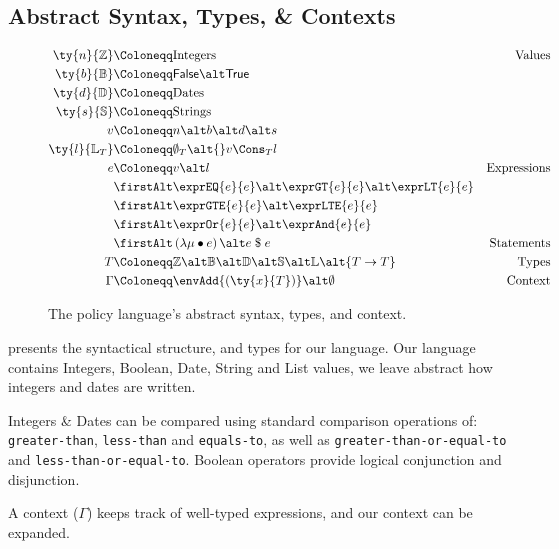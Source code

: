 \subsection{Abstract Syntax, Types, \& Contexts}
\label{subsec:defs}

\begin{figure}[ht]
  \centering
\begin{align*}
  \ty{n}{\mathbb{Z}}
  &
    \Coloneqq
    \text{Integers}
  & \text{Values}
  \\
  \ty{b}{\mathbb{B}}
  & \Coloneqq
    \mathsf{False}\alt\mathsf{True}
  \\
  \ty{d}{\mathbb{D}}
  & \Coloneqq
    \text{Dates}
  \\
  \ty{s}{\mathbb{S}}
  & \Coloneqq
    \text{Strings}
  \\
  v
  &
    \Coloneqq
    n
    \alt
    b
    \alt
    d
    \alt
    s
  \\
  \ty{l}{\mathbb{L}_T}
  & \Coloneqq
    \emptyset_T\alt{}v\Cons_T{}l
  \\
  e
  &
    \Coloneqq
    v
    \alt
    l
  & \text{Expressions}
  \\
  &
    \firstAlt
    \exprEQ{e}{e}
    \alt
    \exprGT{e}{e}
    \alt
    \exprLT{e}{e}
  \\
  & \firstAlt
    \exprGTE{e}{e}
    \alt
    \exprLTE{e}{e}
  &
  \\
  & \firstAlt
    \exprOr{e}{e}
    \alt
    \exprAnd{e}{e}
  &
  \\
  &
    \firstAlt
    \left( \lambda \mu \bullet e \right)
    \alt
    e \; \$ \; e
  &
    \text{Statements}
  \\
  T
  &
    \Coloneqq
    \mathbb{Z}
    \alt
    \mathbb{B}
    \alt
    \mathbb{D}
    \alt
    \mathbb{S}
    \alt
    \mathbb{L}
    \alt
    {T \rightarrow{} T}
  &
    \text{Types}
  \\
  \Gamma
  &
    \Coloneqq
    \envAdd{(\ty{x}{T})}
    \alt
    \emptyset
    &
      \text{Context}
\end{align*}
  \caption{\label{fig:syntax}The policy language's abstract syntax, types, and context.}
\end{figure}

 presents the syntactical structure, and types for our language.
Our language contains Integers, Boolean, Date, String and List values, we leave abstract how integers and dates are written.

Integers \& Dates can be compared using standard comparison operations of: \texttt{greater-than}, \texttt{less-than} and \texttt{equals-to}, as well as \texttt{greater-than-or-equal-to} and \texttt{less-than-or-equal-to}.
Boolean operators provide logical conjunction and disjunction.

A context ($\Gamma$) keeps track of well-typed expressions, and our context can be expanded.
